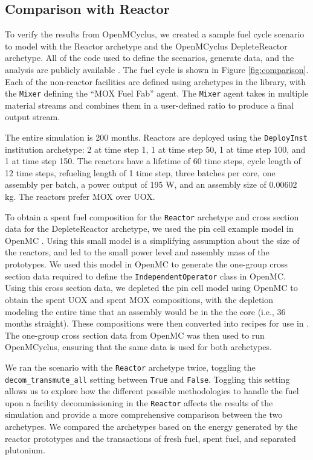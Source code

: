 \subsection{Comparison with \Cycamore Reactor}
To verify the results from OpenMCyclus, we created a sample fuel cycle 
scenario to model with the \Cycamore Reactor archetype and the 
OpenMCyclus DepleteReactor archetype. All of the code used to define the 
scenarios, generate data, and the analysis are publicly available 
\cite{bachmann_openmcyclus_2023}. The fuel cycle is 
shown in Figure 
\ref{fig:comparison}. Each of the non-reactor facilities are defined 
using archetypes in the \Cycamore library, with the \Cycamore \texttt{Mixer}
defining the ``MOX Fuel Fab'' agent. The \texttt{Mixer} agent takes in multiple 
material streams and combines them in a user-defined ratio to produce 
a final output stream. 



The entire simulation is 200 months. Reactors are deployed using the 
\Cycamore \texttt{DeployInst} institution archetype: 2 at time step 1, 
1 at time step 
50, 1 at time step 100, and 1 at time step 150. The reactors have a lifetime 
of 60 time steps, cycle length of 12 time steps, refueling length of 1 
time step, three batches per core, one assembly per batch, a power output of 
195 W, and an assembly size of 0.00602 kg. The reactors prefer MOX over UOX. 
 
To obtain a spent fuel composition for the \Cycamore \texttt{Reactor} 
archetype and cross section data for the DepleteReactor archetype, we 
used the pin cell example model in OpenMC \cite{noauthor_modeling_nodate}. 
Using this 
small model is a simplifying assumption about the size of the reactors, 
and led to the small power level and assembly mass of the prototypes. 
We used this model in OpenMC to generate the one-group cross 
section data required to define the \texttt{IndependentOperator} class 
in OpenMC. Using this cross section data, we depleted the pin cell 
model using OpenMC to obtain the spent UOX and 
spent MOX compositions, with the depletion modeling the entire time that 
an assembly would be in the the core (i.e., 36 months straight). 
These compositions were then converted into recipes for use in 
\Cyclus.
The one-group cross section data from OpenMC was then used to run 
OpenMCyclus, ensuring that the same data is used for both archetypes.  

We ran the scenario with the \Cycamore \texttt{Reactor} archetype twice, 
toggling the \texttt{decom\_transmute\_all} setting between \texttt{True}
and \texttt{False}. Toggling this setting allows us to explore how the 
different possible methodologies to handle the fuel upon a facility 
decommissioning in the \Cycamore \texttt{Reactor} affects the results of 
the simulation and provide a more comprehensive comparison between the 
two archetypes. We compared the archetypes based on the energy generated 
by the reactor prototypes and the transactions of fresh fuel, spent fuel, 
and separated plutonium. 

